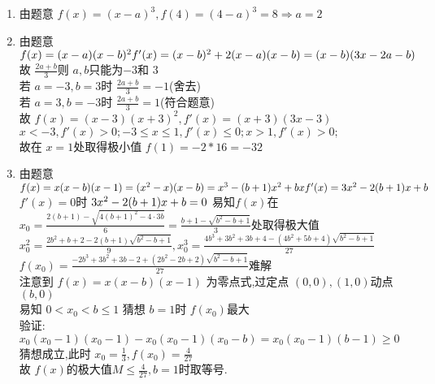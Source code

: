 \documentclass[class=ctexart,crop=false]{standalone}
\begin{document}
    \begin{enumerate}[label=(\arabic*)]
        \item 由题意 $f(x)=(x-a)^3,f(4)=(4-a)^3=8\Rightarrow a=2$
        \item 由题意 $f(x)=(x-a)(x-b)^2\\
            f'(x)=(x-b)^2+2(x-a)(x-b)=(x-b)(3x-2a-b)$\\
            故 $\frac{2a+b}{3}$则 $a,b$只能为$-3$和 $3$\\
            若 $a=-3,b=3$时 $\frac{2a+b}{3}=-1$(舍去)\\
            若 $a=3,b=-3$时 $\frac{2a+b}{3}=1$(符合题意)\\
            故 $f(x)=(x-3)(x+3)^2,f'(x)=(x+3)(3x-3)$\\
            $x<-3,f'(x)>0;-3\leqslant x \leqslant 1,f'(x)\leqslant 0;x>1,f'(x)>0;$\\
            故在 $x=1$处取得极小值 $f(1)=-2*16=-32$            
        \item 由题意 $f(x)=x(x-b)(x-1)=(x^2-x)(x-b)=x^3-(b+1)x^2+bx\\
        f'(x)=3x^2-2(b+1)x+b$\\
        $f'(x)=0$时 $3x^2-2(b+1)x+b=0\\$
        易知$f(x)$在$x_0=\frac{2(b+1)-\sqrt{4(b+1)^2-4\cdot 3b}}{6}
        =\frac{b+1-\sqrt{b^2-b+1}}{3}$处取得极大值\\
        $x_0^2=\frac{2b^2+b+2-2(b+1)\sqrt{b^2-b+1}}{9}, 
        x_0^3=\frac{4b^3+3b^2+3b+4-(4b^2+5b+4)\sqrt{b^2-b+1}}{27}$\\
        $f(x_0)=\frac{-2b^3+3b^2+3b-2+(2b^2-2b+2)\sqrt{b^2-b+1}}{27}$难解\\
        注意到 $f(x)=x(x-b)(x-1)$ 为零点式,过定点 $(0,0),(1,0)$动点 $(b,0)$\\
        易知 $0< x_0< b\leqslant 1$ 猜想 $b=1$时 $f(x_0)$最大\\
        验证: $x_0(x_0-1)(x_0-1)-x_0(x_0-1)(x_0-b)=x_0(x_0-1)(b-1)\geqslant 0$\\
        猜想成立,此时 $x_0=\frac{1}{3},f(x_0)=\frac{4}{27}$\\
        故 $f(x)$的极大值$M\leqslant \frac{4}{27},b=1$时取等号.

    \end{enumerate}
\end{document}
